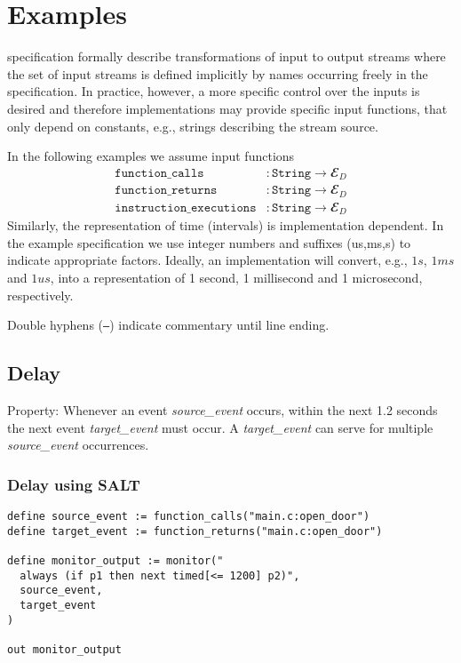 \section{Examples}

\tessla specification formally describe transformations of input to output streams where the set of input streams is defined implicitly by names occurring freely in the specification. 
In practice, however, a more specific control over the inputs is desired and therefore implementations may provide specific input functions, that only depend on constants, e.g., strings describing the stream source.

In the following examples we assume input functions
\begin{align*}
 \mathtt{function\_calls}&: \mathtt{String} → 𝓔_D\\
 \mathtt{function\_returns}&: \mathtt{String} → 𝓔_D\\
\mathtt{instruction\_executions}&:\mathtt{String} → 𝓔_D
\end{align*}
Similarly, the representation of time (intervals) is implementation dependent.
In the example specification we use integer numbers and suffixes (us,ms,s) to indicate appropriate factors. 
Ideally, an implementation will convert, e.g.,  $1s$, $1ms$ and $1us$, into a representation of 1 second, 1 millisecond and 1 microsecond, respectively.

Double hyphens (\texttt{--}) indicate commentary until line ending.

\subsection{Delay}

Property: Whenever an event \emph{source\_event} occurs, within the next 1.2 seconds the next event \emph{target\_event} must occur.
A \emph{target\_event} can serve for multiple \emph{source\_event} occurrences.

\subsubsection{Delay using SALT}

\begin{lstlisting}[language=tessla+salt]
define source_event := function_calls("main.c:open_door")
define target_event := function_returns("main.c:open_door")

define monitor_output := monitor("
  always (if p1 then next timed[<= 1200] p2)",
  source_event,
  target_event
)

out monitor_output
\end{lstlisting}

